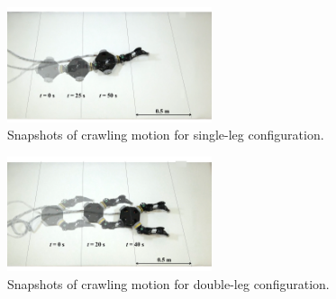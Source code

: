 \documentclass[a4paper,10pt,twocolumn]{jsarticle}
\begin{document}
\begin{figure}[ht]
  \centering
  \includegraphics[width=60mm]{./fig/snapshot/single_snapshot_final.png}
  \caption{Snapshots of crawling motion for single-leg configuration.}\label{fig3singlesnap}
\end{figure}

\begin{figure}[ht]
  \centering
  \includegraphics[width=60mm]{./fig/snapshot/double_snapshot_final.png}
  \caption{Snapshots of crawling motion for double-leg configuration.}\label{fig4doublesnap}
\end{figure}

\end{document}
